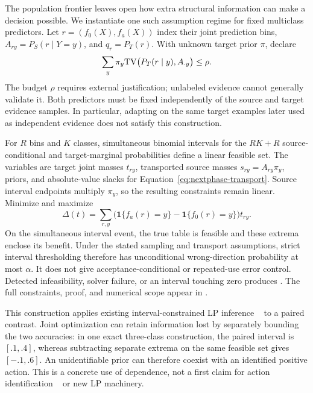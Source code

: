 The population frontier leaves open how extra structural information can make a
decision possible. We instantiate one such assumption regime for fixed multiclass
predictors. Let $r=(f_0(X),f_a(X))$ index their joint prediction bins,
$A_{ry}=P_S(r\mid Y=y)$, and $q_r=P_T(r)$. With unknown target prior $\pi$, declare
\begin{equation}
 \sum_y\pi_y\mathrm{TV}\bigl(P_T(r\mid y),A_{\cdot y}\bigr)\le\rho.
 \label{eq:nextphase-transport}
\end{equation}
The budget $\rho$ requires external justification; unlabeled evidence cannot
generally validate it. Both predictors must be fixed independently of the
source and target evidence samples. In particular, adapting on the same target
examples later used as independent evidence does not satisfy this construction.

For $R$ bins and $K$ classes, simultaneous binomial intervals for the $RK+R$
source-conditional and target-marginal probabilities define a linear feasible
set. The variables are target joint masses $t_{ry}$, transported source masses
$s_{ry}=A_{ry}\pi_y$, priors, and absolute-value slacks for
Equation~\eqref{eq:nextphase-transport}. Source interval endpoints multiply
$\pi_y$, so the resulting constraints remain linear. Minimize and maximize
\begin{equation}
 \Delta(t)=\sum_{r,y}
 \bigl(\mathbf{1}\{f_a(r)=y\}-\mathbf{1}\{f_0(r)=y\}\bigr)t_{ry}.
 \label{eq:nextphase-paired-objective}
\end{equation}
On the simultaneous interval event, the true table is feasible and these extrema
enclose its benefit. Under the stated sampling and transport assumptions,
strict interval thresholding therefore has unconditional wrong-direction
probability at most $\alpha$. It does not give acceptance-conditional or
repeated-use error control. Detected infeasibility, solver failure, or an interval
touching zero produces \abstain. The full constraints, proof, and numerical
scope appear in .

This construction applies existing interval-constrained LP inference
~\cite{li2026matrixconstraints} to a paired contrast. Joint optimization can
retain information lost by separately bounding the two accuracies: in one exact
three-class construction, the paired interval is $[.1,.4]$, whereas subtracting
separate extrema on the same feasible set gives $[-.1,.6]$. An unidentifiable
prior can therefore coexist with an identified positive action. This is a
concrete use of dependence, not a first claim for action identification
~\cite{jhawar2026identifiable} or new LP machinery.

